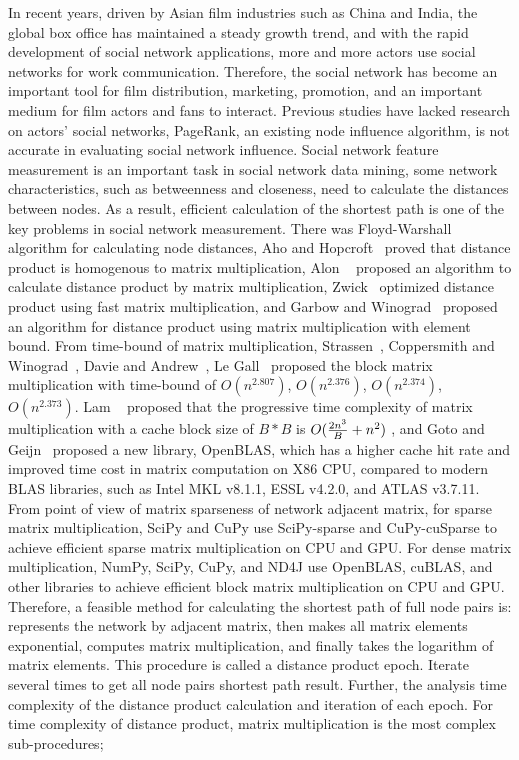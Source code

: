 \documentclass[review]{cvpr}
\begin{document}
In recent years, driven by Asian film industries such as China and India, the global box office has maintained a steady growth trend, and with the rapid development of social network applications, more and more actors use social networks for work communication.
Therefore, the social network has become an important tool for film distribution, marketing, promotion, and an important medium for film actors and fans to interact.
Previous studies have lacked research on actors' social networks, PageRank, an existing node influence algorithm, is not accurate in evaluating social network influence.
Social network feature measurement is an important task in social network data mining, some network characteristics, such as betweenness and closeness, need to calculate the distances between nodes.
As a result, efficient calculation of the shortest path is one of the key problems in social network measurement.
There was Floyd-Warshall~\cite{floyd1962algorithm,warshall1962theorem} algorithm for calculating node distances, Aho and Hopcroft~\cite{aho1974design} proved that distance product is homogenous to matrix multiplication,
Alon \etal~\cite{alon1997exponent} proposed an algorithm to calculate distance product by matrix multiplication, Zwick~\cite{zwick2002all} optimized distance product using fast matrix multiplication,
and Garbow and Winograd~\cite{garbow1985scaling} proposed an algorithm for distance product using matrix multiplication with element bound.
From time-bound of matrix multiplication, Strassen~\cite{strassen1969gaussian}, Coppersmith and Winograd~\cite{coppersmith1987matrix}, Davie and Andrew~\cite{davie2013improved}, Le Gall~\cite{le2014powers} proposed the block matrix multiplication with time-bound of \(O(n ^ {2.807})\), \(O(n^{2.376})\), \(O(n^{2.374})\), \(O(n^{2.373})\).
Lam \etal~\cite{lam1991cache} proposed that the progressive time complexity of matrix multiplication with a cache block size of $B*B$ is \(O({2n^3 \over B}+{n^2})\) ,
and Goto and Geijn~\cite{goto2008anatomy} proposed a new library, OpenBLAS, which has a higher cache hit rate and improved time cost in matrix computation on X86 CPU, compared to modern BLAS libraries, such as Intel MKL v8.1.1, ESSL v4.2.0, and ATLAS v3.7.11.
From point of view of matrix sparseness of network adjacent matrix, for sparse matrix multiplication, SciPy and CuPy use SciPy-sparse and CuPy-cuSparse to achieve efficient sparse matrix multiplication on CPU and GPU.
For dense matrix multiplication, NumPy, SciPy, CuPy, and ND4J use OpenBLAS, cuBLAS, and other libraries to achieve efficient block matrix multiplication on CPU and GPU.
Therefore, a feasible method for calculating the shortest path of full node pairs is: represents the network by adjacent matrix, then makes all matrix elements exponential, computes matrix multiplication, and finally takes the logarithm of matrix elements.
This procedure is called a distance product epoch.
Iterate several times to get all node pairs shortest path result.
Further, the analysis time complexity of the distance product calculation and iteration of each epoch.
For time complexity of distance product, matrix multiplication is the most complex sub-procedures;
\end{document}
